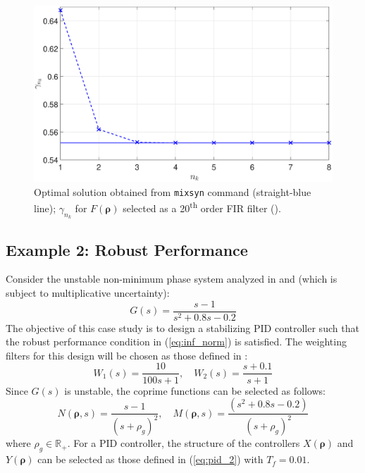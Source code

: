 \documentclass[letterpaper, 10 pt, conference]{ieeeconf}  %
\begin{document}
\begin{figure}
\centering
\includegraphics[width=\columnwidth]{../pics/gamma_convergence_F_fixed.eps}
\caption{Optimal solution obtained from \texttt{mixsyn} command (straight-blue line); $\gamma_{n_k}$ for $F(\bm{\rho})$ selected as a 20\textsuperscript{th} order FIR filter ({\color{blue}{- -X- -}}).}
\label{fig:ex1_2}
\end{figure}



\subsection{Example 2: Robust Performance}
Consider the unstable non-minimum phase system analyzed in \cite{Zhe10}  and \cite{Ho03} (which is subject to multiplicative uncertainty):
\begin{equation}
G(s) = \frac{s-1}{s^2+0.8s-0.2}
\end{equation}
The objective of this case study is to design a stabilizing PID controller such that the robust performance condition in (\ref{eq:inf_norm}) is satisfied. The weighting filters for this design will be chosen as those defined in \cite{Zhe10}:
\begin{equation}
W_1(s) = \frac{10}{100s+1}, \quad W_2(s) = \frac{s+0.1}{s+1}
\end{equation}
Since $G(s)$ is unstable, the coprime functions can be selected as follows:
\begin{equation}
N(\bm{\rho},s) = \frac{s-1}{(s+\rho_g)^2}, \quad M(\bm{\rho},s) = \frac{(s^2+0.8s-0.2)}{(s+\rho_g)^2}
\end{equation}
where $\rho_g \in \mathbb{R}_+$. For a PID controller, the structure of the controllers $X(\bm{\rho})$ and $Y(\bm{\rho})$ can be selected as those defined in (\ref{eq:pid_2}) with $T_f = 0.01$. 
\end{document}
